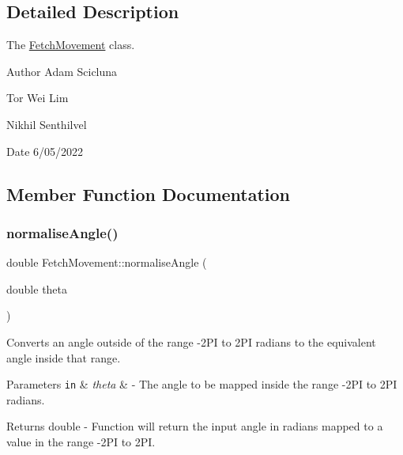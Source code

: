 \subsection{Detailed Description}
The \hyperlink{classFetchMovement}{Fetch\+Movement} class. 

\begin{DoxyAuthor}{Author}
Adam Scicluna 

Tor Wei Lim 

Nikhil Senthilvel 
\end{DoxyAuthor}
\begin{DoxyDate}{Date}
6/05/2022 
\end{DoxyDate}


\subsection{Member Function Documentation}
\mbox{\label{classFetchMovement_af68c8b26e41ca9c6bca4dba2ccaf5643}} 
\subsubsection{\texorpdfstring{normalise\+Angle()}{normaliseAngle()}}
{\footnotesize\ttfamily double Fetch\+Movement\+::normalise\+Angle (\begin{DoxyParamCaption}\item[{double}]{theta }\end{DoxyParamCaption})}



Converts an angle outside of the range -\/2\+PI to 2\+PI radians to the equivalent angle inside that range. 


\begin{DoxyParams}[1]{Parameters}
\mbox{\tt in}  & {\em theta} & -\/ The angle to be mapped inside the range -\/2\+PI to 2\+PI radians.\\
\hline
\end{DoxyParams}
\begin{DoxyReturn}{Returns}
double -\/ Function will return the input angle in radians mapped to a value in the range -\/2\+PI to 2\+PI. 
\end{DoxyReturn}
\mbox{\label{classFetchMovement_a1bf728d52720e41eda38728ebc0b43f8}} 
